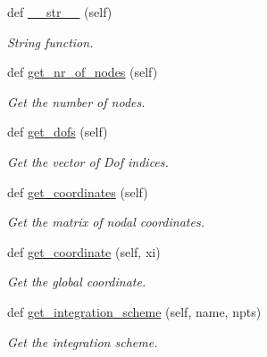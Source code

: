 \begin{DoxyCompactItemize}
\mbox{\label{classmyFElib_1_1Element_a6531605379a0fd66b0234555f9aada54}} 
def \mbox{\hyperlink{classmyFElib_1_1Element_a6531605379a0fd66b0234555f9aada54}{\+\_\+\+\_\+str\+\_\+\+\_\+}} (self)
\begin{DoxyCompactList}\small\item\em String function. \end{DoxyCompactList}\item 
\mbox{\label{classmyFElib_1_1Element_a794e06706b7c28ae5c270aaa81543d83}} 
def \mbox{\hyperlink{classmyFElib_1_1Element_a794e06706b7c28ae5c270aaa81543d83}{get\+\_\+nr\+\_\+of\+\_\+nodes}} (self)
\begin{DoxyCompactList}\small\item\em Get the number of nodes. \end{DoxyCompactList}\item 
\mbox{\label{classmyFElib_1_1Element_ac34b9e031c66292df64319e0f8c484e5}} 
def \mbox{\hyperlink{classmyFElib_1_1Element_ac34b9e031c66292df64319e0f8c484e5}{get\+\_\+dofs}} (self)
\begin{DoxyCompactList}\small\item\em Get the vector of Dof indices. \end{DoxyCompactList}\item 
\mbox{\label{classmyFElib_1_1Element_ab2cfeed31c11464254d4b5127198b688}} 
def \mbox{\hyperlink{classmyFElib_1_1Element_ab2cfeed31c11464254d4b5127198b688}{get\+\_\+coordinates}} (self)
\begin{DoxyCompactList}\small\item\em Get the matrix of nodal coordinates. \end{DoxyCompactList}\item 
def \mbox{\hyperlink{classmyFElib_1_1Element_a26c80e9fbf623256b93686058f4b3803}{get\+\_\+coordinate}} (self, xi)
\begin{DoxyCompactList}\small\item\em Get the global coordinate. \end{DoxyCompactList}\item 
def \mbox{\hyperlink{classmyFElib_1_1Element_abe19841e55cda21ce54424043125fb73}{get\+\_\+integration\+\_\+scheme}} (self, name, npts)
\begin{DoxyCompactList}\small\item\em Get the integration scheme. \end{DoxyCompactList}\item 

\end{DoxyCompactItemize}
